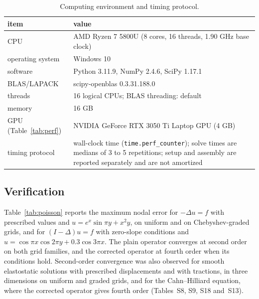 \documentclass[smallextended,envcountsame]{svjour3}
\begin{document}
\begin{table}[t]\centering\footnotesize
\caption{Computing environment and timing protocol.}\label{tab:env}
\begin{tabular}{p{}p{}}
\toprule
item & value\\
\midrule
CPU & AMD Ryzen 7 5800U (8 cores, 16 threads, 1.90 GHz base clock)\\
operating system & Windows 10\\
software & Python 3.11.9, NumPy 2.4.6, SciPy 1.17.1\\
BLAS/LAPACK & scipy-openblas 0.3.31.188.0\\
threads & 16 logical CPUs; BLAS threading: default\\
memory & 16 GB\\
GPU (Table~\ref{tab:perf}) & NVIDIA GeForce RTX 3050 Ti Laptop GPU (4 GB)\\
timing protocol & wall-clock time (\texttt{time.perf\_counter}); solve times are medians of 3 to 5 repetitions; setup and assembly are reported separately and are not amortized\\
\bottomrule
\end{tabular}
\end{table}

\subsection{Verification}\label{sec:verify}
Table~\ref{tab:poisson} reports the maximum nodal error for $-\Delta u=f$ with prescribed values and
$u=e^x\sin\pi y+x^2y$, on uniform and on Chebyshev-graded grids, and for $(I-\Delta)u=f$ with zero-slope
conditions and $u=\cos\pi x\cos2\pi y+0.3\cos3\pi x$. The plain operator converges at second order on both
grid families, and the corrected operator at fourth order when its conditions hold. Second-order
convergence was also observed for smooth elastostatic solutions with prescribed displacements and with
tractions, in three dimensions on uniform and graded grids, and for the Cahn--Hilliard equation, where the
corrected operator gives fourth order (Tables~S8, S9, S18 and~S13).
\end{document}
